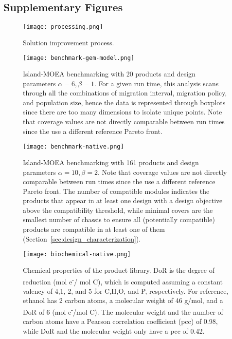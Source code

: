 \subsection*{Supplementary Figures}

\begin{figure}[H]
    \centering
    \texttt{[image: processing.png]}
    \caption[Solution improvement process]{Solution improvement process.}
    \label{fig7:processing}
\end{figure}

\begin{figure}[H]
    \centering
    \texttt{[image: benchmark-gem-model.png]}
    \caption[Island-MOEA benchmarking with 20 products]{Island-MOEA benchmarking with 20 products and design parameters $\alpha=6, \beta=1$. For a given run time, this analysis scans through all the combinations of migration interval, migration policy, and population size, hence the data is represented through boxplots since there are too many dimensions to isolate unique points. Note that coverage values are not directly comparable between run times since the use a different reference Pareto front.}
    \label{fig7:benchmark-20prod}
\end{figure}

\begin{figure}[H]
    \centering
    \texttt{[image: benchmark-native.png]}
    \caption[Island-MOEA benchmarking with 161 products]{Island-MOEA benchmarking with 161 products and design parameters $\alpha=10, \beta=2$. Note that coverage values are not directly comparable between run times since the use a different reference Pareto front. The number of compatible modules indicates the products that appear in at least one design with a design objective above the compatibility threshold, while minimal covers are the smallest number of chassis to ensure all (potentially compatible) products are compatible in at least one of them (Section~\ref{sec:design_characterization}).} %
    \label{fig7:benchmark-161prod}
\end{figure}

\begin{figure}[H]
    \centering
    \texttt{[image: biochemical-native.png]}
    \caption[Chemical properties of the product library]{Chemical properties of the product library. DoR is the degree of reduction (mol e\textsuperscript{-}/ mol C), which is computed assuming a constant valency of 4,1,-2, and 5 for C,H,O, and P, respectively.  For reference, ethanol has 2 carbon atoms, a molecular weight of 46 g/mol, and a DoR of 6 (mol e\textsuperscript{-}/mol C). The molecular weight and the number of carbon atoms have a Pearson correlation coefficient (pcc) of 0.98, while DoR and the molecular weight only have a pcc of 0.42.}
    \label{fig7:biochemical-properties}
\end{figure}

